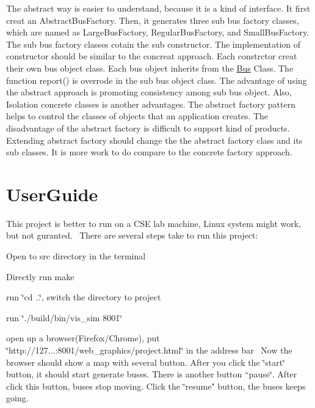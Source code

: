 The abstract way is easier to understand, because it is a kind of interface. It first creat an Abstract\+Bus\+Factory. Then, it generates three sub bus factory classes, which are named as Large\+Bus\+Factory, Regular\+Bus\+Factory, and Small\+Bus\+Factory. The sub bus factory classes cotain the sub constructor. The implementation of constructor should be similar to the concreat approach. Each constrctor creat their own bus object class. Each bus object inherits from the \hyperlink{classBus}{Bus} Class. The function report() is overrode in the sub bus object class. The advantage of using the abstract approach is promoting consistency among sub bus object. Also, Isolation concrete classes is another advantages. The abstract factory pattern helps to control the classes of objects that an application creates. The disadvantage of the abstract factory is difficult to support kind of products. Extending abstract factory should change the the abstract factory class and its sub classes. It is more work to do compare to the concrete factory approach.~\newline
\hypertarget{index_UserGuide}{}\section{User\+Guide}\label{index_UserGuide}
This project is better to run on a C\+SE lab machine, Linux system might work, but not guranted.~\newline
There are several steps take to run this project\+:
\begin{DoxyEnumerate}
\item Open to src directory in the terminal
\item Directly run make
\item run \char`\"{}cd ..\char`\"{}, switch the directory to project
\item run \char`\"{}./build/bin/vis\+\_\+sim 8001\char`\"{}
\item open up a browser(Firefox/\+Chrome), put \char`\"{}http\+://127...\+:8001/web\+\_\+graphics/project.\+html\char`\"{} in the address bar~\newline
Now the browser should show a map with several button. After you click the \char`\"{}start\char`\"{} button, it should start generate buses. There is another button “pause\char`\"{}. After click this button, buses stop moving.
\+Click the \char`\"{}resume" button, the buses keeps going. 
\end{DoxyEnumerate}